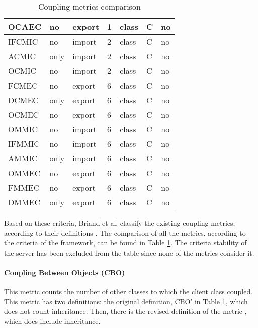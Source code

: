 \begin{table}[p]
\begin{center}
\begin{tabular}{|l|l|l|l|l|l|l|}
    OCAEC         & no    & export  & 1     & class               & C     & no      \\
    \hline
    IFCMIC        & no    & import  & 2     & class               & C     & no      \\
    ACMIC         & only  & import  & 2     & class               & C     & no      \\
    OCMIC         & no    & import  & 2     & class               & C     & no      \\
    FCMEC         & no    & export  & 6     & class               & C     & no      \\
    DCMEC         & only  & export  & 6     & class               & C     & no      \\
    OCMEC         & no    & export  & 6     & class               & C     & no      \\
    \hline
    OMMIC         & no    & import  & 6     & class               & C     & no      \\
    IFMMIC        & no    & import  & 6     & class               & C     & no      \\
    AMMIC         & only  & import  & 6     & class               & C     & no      \\
    OMMEC         & no    & export  & 6     & class               & C     & no      \\
    FMMEC         & no    & export  & 6     & class               & C     & no      \\
    DMMEC         & only  & export  & 6     & class               & C     & no      \\
    \hline
    \end{tabular}
    \end{center}
    \caption{Coupling metrics comparison}
    \label{table:coupling-metrics}
\end{table}


\blankl
Based on these criteria, Briand et al. classify the existing coupling metrics, according to their definitions \cite{briand1999unified}. The comparison of all the metrics, according to the criteria of the framework, can be found in Table \ref{table:coupling-metrics}. The criteria stability of the server has been excluded from the table since none of the metrics consider it.

\paragraph{Coupling Between Objects (CBO)} This metric counts the number of other classes to which the client class coupled. This metric has two definitions: the original definition, CBO' in Table \ref{table:coupling-metrics}, which does not count inheritance. Then, there is the revised definition of the metric \cite{chidamber1994metrics}, which does include inheritance.

